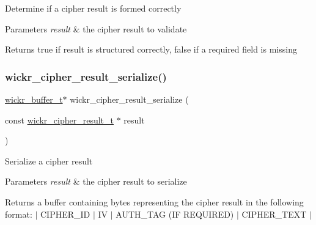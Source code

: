 Determine if a cipher result is formed correctly


\begin{DoxyParams}{Parameters}
{\em result} & the cipher result to validate \\
\hline
\end{DoxyParams}
\begin{DoxyReturn}{Returns}
true if result is structured correctly, false if a required field is missing 
\end{DoxyReturn}
\mbox{\label{group__wickr__cipher_gacda386115dc52f83a0518f8ac0dad6a2}} 
\subsubsection{\texorpdfstring{wickr\+\_\+cipher\+\_\+result\+\_\+serialize()}{wickr\_cipher\_result\_serialize()}}
{\footnotesize\ttfamily \hyperlink{structwickr__buffer}{wickr\+\_\+buffer\+\_\+t}$\ast$ wickr\+\_\+cipher\+\_\+result\+\_\+serialize (\begin{DoxyParamCaption}\item[{const \hyperlink{structwickr__cipher__result}{wickr\+\_\+cipher\+\_\+result\+\_\+t} $\ast$}]{result }\end{DoxyParamCaption})}

Serialize a cipher result


\begin{DoxyParams}{Parameters}
{\em result} & the cipher result to serialize \\
\hline
\end{DoxyParams}
\begin{DoxyReturn}{Returns}
a buffer containing bytes representing the cipher result in the following format\+: $\vert$ C\+I\+P\+H\+E\+R\+\_\+\+ID $\vert$ IV $\vert$ A\+U\+T\+H\+\_\+\+T\+AG (IF R\+E\+Q\+U\+I\+R\+ED) $\vert$ C\+I\+P\+H\+E\+R\+\_\+\+T\+E\+XT $\vert$ 
\end{DoxyReturn}
